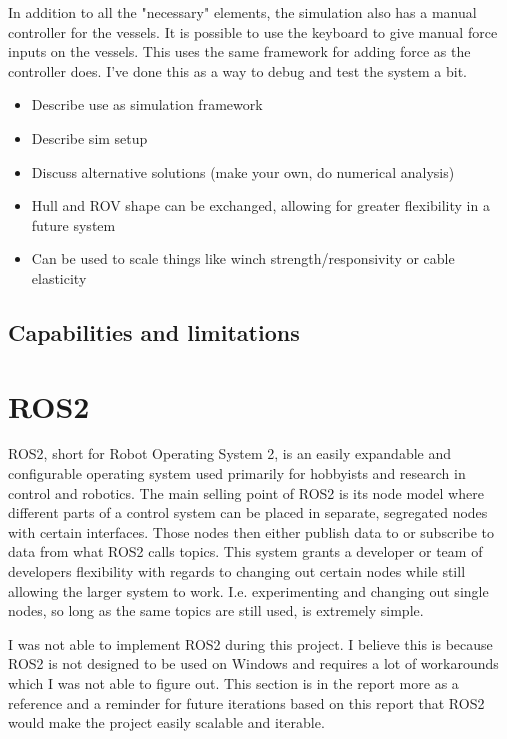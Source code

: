 In addition to all the "necessary" elements, the simulation also has a manual controller for the vessels. It is possible to use the keyboard to give manual force inputs on the vessels. This uses the same framework for adding force as the controller does. I've done this as a way to debug and test the system a bit. 



\begin{itemize}
\item Describe use as simulation framework
\item Describe sim setup
\item Discuss alternative solutions (make your own, do numerical analysis)
\item Hull and ROV shape can be exchanged, allowing for greater flexibility in a future system
\item Can be used to scale things like winch strength/responsivity or cable elasticity
\end{itemize}
\subsection{Capabilities and limitations}

\section{ROS2}
\label{sec:ros}
ROS2, short for Robot Operating System 2, is an easily expandable and configurable operating system used primarily for hobbyists and research in control and robotics. The main selling point of ROS2 is its node model where different parts of a control system can be placed in separate, segregated nodes with certain interfaces. Those nodes then either publish data to or subscribe to data from what ROS2 calls topics. This system grants a developer or team of developers flexibility with regards to changing out certain nodes while still allowing the larger system to work. I.e. experimenting and changing out single nodes, so long as the same topics are still used, is extremely simple. 

I was not able to implement ROS2 during this project. I believe this is because ROS2 is not designed to be used on Windows and requires a lot of workarounds which I was not able to figure out. This section is in the report more as a reference and a reminder for future iterations based on this report that ROS2 would make the project easily scalable and iterable. 

